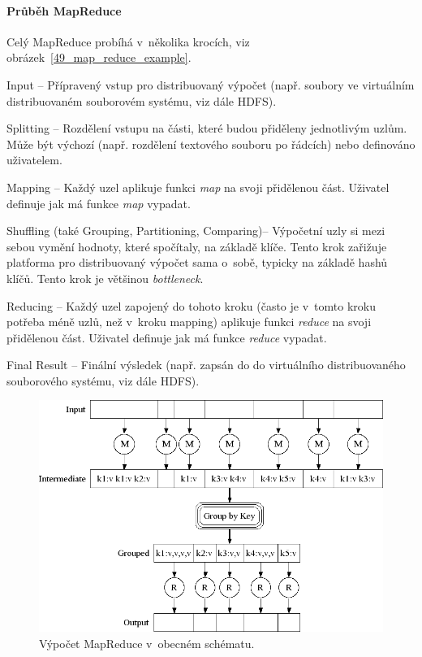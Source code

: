 \paragraph*{Průběh MapReduce} Celý MapReduce probíhá v~několika krocích, viz obrázek~\ref{49_map_reduce_example}.
\begin{compactenum}
    \item Input -- Přípravený vstup pro distribuovaný výpočet (např. soubory ve virtuálním distribuovaném souborovém systému, viz dále HDFS).
    \item Splitting -- Rozdělení vstupu na části, které budou přiděleny jednotlivým uzlům. Může být výchozí (např. rozdělení textového souboru po řádcích) nebo definováno uživatelem.
    \item Mapping -- Každý uzel aplikuje funkci \textit{map} na svoji přidělenou část. Uživatel definuje jak má funkce \textit{map} vypadat.
    \item Shuffling (také Grouping, Partitioning, Comparing)-- Výpočetní uzly si mezi sebou vymění hodnoty, které spočítaly, na základě klíče. Tento krok zařižuje platforma pro distribuovaný výpočet sama o~sobě, typicky na základě hashů klíčů. Tento krok je většinou \textit{bottleneck}.
    \item Reducing -- Každý uzel zapojený do tohoto kroku (často je v~tomto kroku potřeba méně uzlů, než v~kroku mapping) aplikuje funkci \textit{reduce} na svoji přidělenou část. Uživatel definuje jak má funkce \textit{reduce} vypadat.
    \item Final Result -- Finální výsledek (např. zapsán do do virtuálního distribuovaného souborového systému, viz dále HDFS).
\end{compactenum}

\begin{figure}[H]
    \centering
    \includegraphics[width=1\linewidth]{map_reduce_general_p1.png}
    \caption{Výpočet MapReduce v~obecném schématu.}
\end{figure}

